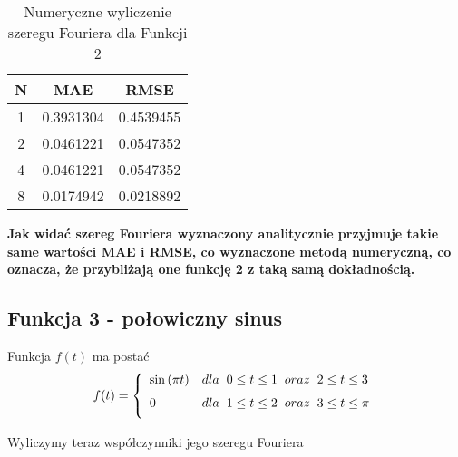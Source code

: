 \documentclass[leqno,a4paper]{article}
\begin{document}
\begin{table}
\centering
\begin{tabular}{||c c c||} 
 \hline
 N & MAE & RMSE \\ 
 \hline\hline
 1 & 0.3931304 & 0.4539455 \\ 
 2 & 0.0461221 & 0.0547352 \\
 4 & 0.0461221 & 0.0547352 \\
 8 & 0.0174942 & 0.0218892 \\
 \hline\hline
\end{tabular}
\caption{Numeryczne wyliczenie szeregu Fouriera dla Funkcji 2}
\end{table}
\textbf{Jak widać szereg Fouriera wyznaczony analitycznie przyjmuje takie same wartości MAE i RMSE, co wyznaczone metodą numeryczną, co oznacza, że przybliżają one funkcję 2 z taką samą dokładnością.}

{}
\subsection*{Funkcja 3 - połowiczny sinus}

Funkcja $f(t)$ ma postać
\[  f(t)= \left\{
\begin{array}{ll}
      \sin{(\pi t)} &dla\hspace{0.2cm}0 \leq t\leq 1\hspace{0.2cm}oraz\hspace{0.2cm} 2 \leq t\leq 3 \\[1.5ex]
      0 &dla\hspace{0.2cm}1 \leq t\leq 2\hspace{0.2cm}oraz\hspace{0.2cm}3 \leq t\leq \pi \\[1.5ex]
\end{array}  
\right. \]

Wyliczymy teraz współczynniki jego szeregu Fouriera 
\newline
\end{document}
